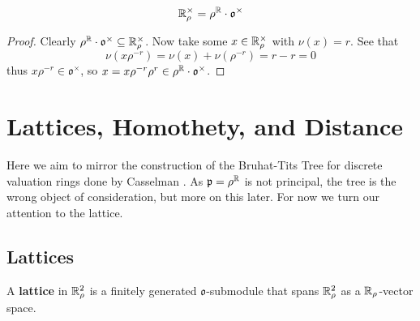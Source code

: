 \documentclass[draft]{amsart}
\begin{document}
    

    \begin{lemma}\label{lemma:rhoRisProduct}
    \[\mathbb{R}_\rho^\times=\rho^{\mathbb{R}} \cdot \mathfrak  o^\times\]
    \end{lemma}
    \begin{proof}
        Clearly \(\rho^{\mathbb{R}} \cdot \mathfrak o ^\times \subseteq \mathbb{R}_\rho^\times\). Now take some \(x\in \mathbb{R}_\rho^\times\) with \(\nu(x)=r\). See that 
        \[\nu(x\rho^{-r})=\nu(x)+\nu(\rho^{-r})=r-r=0\]
        thus \(x\rho^{-r}\in \mathfrak o^\times\), so \(x=x\rho^{-r}\rho^r\in \rho^{\mathbb{R}} \cdot \mathfrak o ^\times\).
    \end{proof}
    
\section{Lattices, Homothety, and Distance }
    Here we aim to mirror the construction of the Bruhat-Tits Tree for discrete valuation rings done by Casselman \cite{Casselman2014TheBT}. As \(\mathfrak p=\rho^{\mathbb{R}}\) is not principal, the tree is the wrong object of consideration, but more on this later. For now we turn our attention to the lattice.

\subsection{Lattices}
    \begin{defn}\label{def:lattice}
    A \textbf{lattice} in \( \mathbb{R}_\rho ^2\) is a finitely generated \(\mathfrak o\)-submodule that spans \( \mathbb{R}_\rho ^2\) as a \( \mathbb{R}_\rho \)-vector space.
\end{defn}
\end{document}
